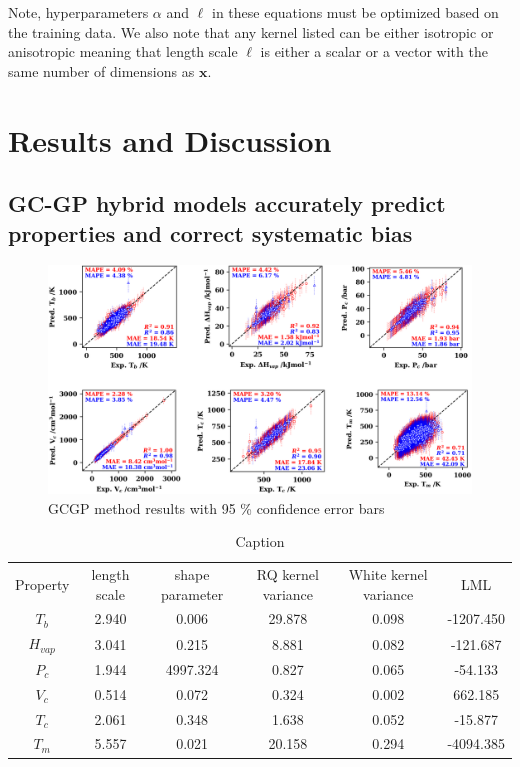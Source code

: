 \documentclass[journal=jacsat,manuscript=article]{achemso}
\begin{document}
Note, hyperparameters $\alpha$ and $\ell$ in these equations must be optimized based on the training data. We also note that any kernel listed can be either isotropic or anisotropic meaning that length scale $\ell$ is either a scalar or a vector with the same number of dimensions as $\mathbf{x}$.



\section{Results and Discussion}

\subsection{GC-GP hybrid models accurately predict properties and correct systematic bias}

\begin{figure}[H]
    \centering
    \includegraphics[width=1\linewidth]{images/2D_GCGP_pred_results_SI.png}
    \caption{GCGP method results with 95 \% confidence error bars}
    \label{fig:GCGP_with_error_bars}
\end{figure}





\begin{table}[H]
    \centering
    \begin{tabular}{cccccc}
         Property&  length scale&  shape parameter&  RQ kernel variance&  White kernel variance&  LML
\\
         $T_b$&  2.940&  0.006&  29.878&  0.098&  -1207.450
\\
         $H_{vap}$&  3.041&  0.215&  8.881&  0.082&  -121.687
\\
         $P_c$&  1.944&  4997.324&  0.827&  0.065&  -54.133
\\
         $V_c$&  0.514&  0.072&  0.324&  0.002&  662.185
\\
         $T_c$&  2.061&  0.348&  1.638&  0.052&  -15.877
\\
         $T_m$&  5.557&  0.021&  20.158&  0.294&  -4094.385
\\
    \end{tabular}
    \caption{Caption}
    \label{tab:my_label}
\end{table}
\end{document}
